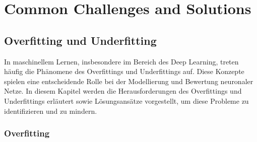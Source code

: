\chapter{Common Challenges and Solutions}

\section{Overfitting und Underfitting}

In maschinellem Lernen, insbesondere im Bereich des Deep Learning, treten häufig die Phänomene des Overfittings und Underfittings auf. Diese Konzepte spielen eine entscheidende Rolle bei der Modellierung und Bewertung neuronaler Netze. In diesem Kapitel werden die Herausforderungen des Overfittings und Underfittings erläutert sowie Lösungsansätze vorgestellt, um diese Probleme zu identifizieren und zu mindern.

\subsection{Overfitting}

